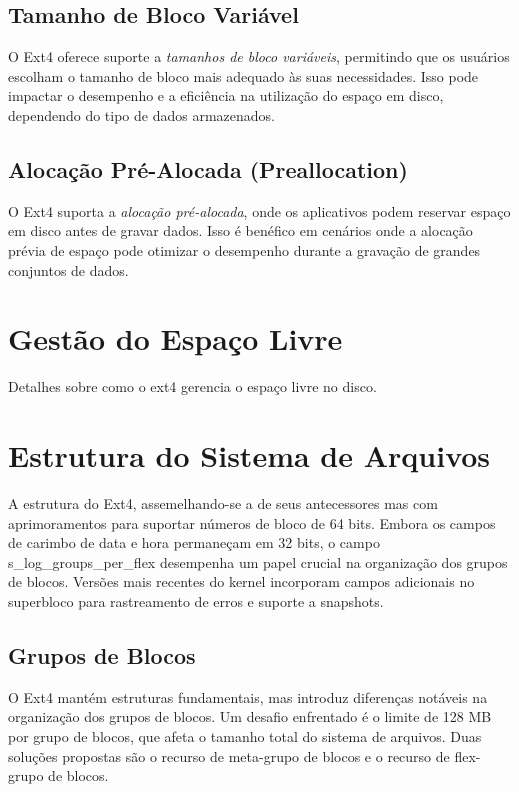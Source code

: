 \documentclass[
	12pt,				%
	openright,			%
	oneside,			%
	a4paper,			%
	chapter=TITLE,		%
	english,			%
	french,				%
	spanish,			%
	brazil				%
	]{abntex2}
\theoremstyle{definition}
\begin{document}
\section{Tamanho de Bloco Variável}
O Ext4 oferece suporte a \textit{tamanhos de bloco variáveis}, permitindo que os usuários escolham o tamanho de bloco mais adequado às suas necessidades. Isso pode impactar o desempenho e a eficiência na utilização do espaço em disco, dependendo do tipo de dados armazenados.

\section{Alocação Pré-Alocada (Preallocation)}
O Ext4 suporta a \textit{alocação pré-alocada}, onde os aplicativos podem reservar espaço em disco antes de gravar dados. Isso é benéfico em cenários onde a alocação prévia de espaço pode otimizar o desempenho durante a gravação de grandes conjuntos de dados.

\chapter{Gestão do Espaço Livre}
Detalhes sobre como o ext4 gerencia o espaço livre no disco.

\chapter{Estrutura do Sistema de Arquivos}
A estrutura do Ext4, assemelhando-se a de seus antecessores mas com aprimoramentos 
para suportar números de bloco de 64 bits. Embora os campos de carimbo de data e hora 
permaneçam em 32 bits, o campo s\_log\_groups\_per\_flex desempenha um papel crucial 
na organização dos grupos de blocos. Versões mais recentes do kernel incorporam campos 
adicionais no superbloco para rastreamento de erros e suporte a snapshots.

\section{Grupos de Blocos}
O Ext4 mantém estruturas fundamentais, mas introduz diferenças notáveis na organização 
dos grupos de blocos. Um desafio enfrentado é o limite de 128 MB por grupo de blocos, 
que afeta o tamanho total do sistema de arquivos. Duas soluções propostas são o recurso de 
meta-grupo de blocos e o recurso de flex-grupo de blocos.
\end{document}
